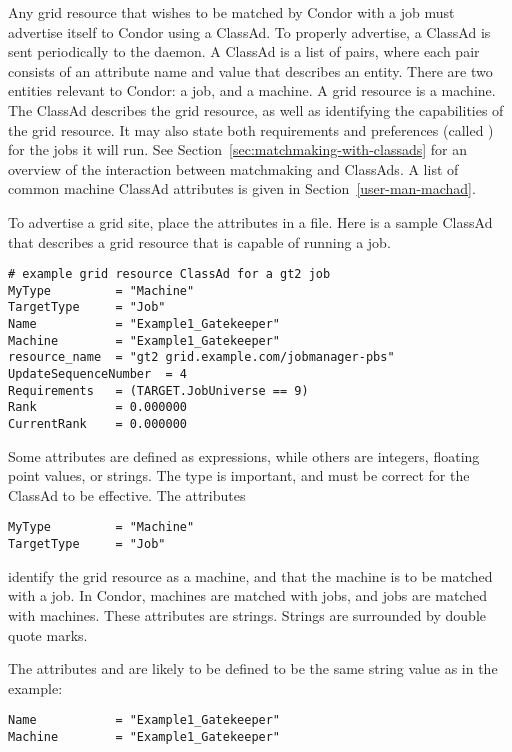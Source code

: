Any grid resource that wishes to be matched by Condor with
a job must advertise itself to Condor using a ClassAd.
To properly advertise, a ClassAd is sent
periodically to the  daemon.
A ClassAd is a list of pairs, where each pair consists of
an attribute name and value that describes an entity.
There are two entities relevant to Condor:
a job, and a machine.
A grid resource is a machine.
The ClassAd describes the grid resource, as well
as identifying the capabilities of the grid resource.
It may also state both requirements and preferences
(called ) for the jobs it will run.
See
Section~\ref{sec:matchmaking-with-classads} for an overview
of the interaction between matchmaking and ClassAds.
A list of common machine ClassAd attributes is given in
Section~\ref{user-man-machad}.

To advertise a grid site, place the attributes
in a file.
Here is a sample ClassAd that describes a grid resource
that is capable of running a
 job.

\footnotesize
\begin{verbatim}
# example grid resource ClassAd for a gt2 job
MyType         = "Machine"
TargetType     = "Job"
Name           = "Example1_Gatekeeper"
Machine        = "Example1_Gatekeeper"
resource_name  = "gt2 grid.example.com/jobmanager-pbs"
UpdateSequenceNumber  = 4
Requirements   = (TARGET.JobUniverse == 9)
Rank           = 0.000000
CurrentRank    = 0.000000
\end{verbatim}
\normalsize


Some attributes are defined as expressions, while
others are integers, floating point values, or strings.
The type is important, and must be correct for the
ClassAd to be effective.
The attributes
\begin{verbatim}
MyType         = "Machine"
TargetType     = "Job"
\end{verbatim}
identify the grid resource as a machine,
and that the machine is to be matched with a job.
In Condor, machines are matched with jobs, and jobs are matched with
machines.
These attributes are strings.
Strings are surrounded by double quote marks.

The attributes  and 
are likely to be defined to be the same string value as in the
example:
\footnotesize
\begin{verbatim}
Name           = "Example1_Gatekeeper"
Machine        = "Example1_Gatekeeper"
\end{verbatim}
\normalsize

